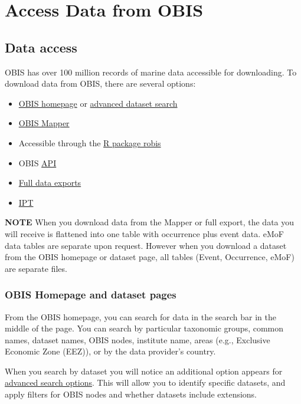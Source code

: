\documentclass[
  letterpaper,
  DIV=11,
  numbers=noendperiod,
  oneside]{scrreprt}
\providecommand{\tightlist}{%
  \setlength{\itemsep}{0pt}\setlength{\parskip}{0pt}}\usepackage{longtable,booktabs,array}
\begin{document}
\part{Access Data from OBIS}

\hypertarget{data-access}{%
\chapter{Data access}\label{data-access}}

OBIS has over 100 million records of marine data accessible for
downloading. To download data from OBIS, there are several options:

\begin{itemize}
\tightlist
\item
  \href{https://obis.org/}{OBIS homepage} or
  \href{https://obis.org/datasets}{advanced dataset search}
\item
  \href{https://mapper.obis.org}{OBIS Mapper}
\item
  Accessible through the \href{https://github.com/iobis/robis}{R package
  robis}
\item
  OBIS \href{https://api.obis.org/}{API}
\item
  \protect\hyperlink{full-exports}{Full data exports}
\item
  \href{ipt.html}{IPT}
\end{itemize}

\textbf{NOTE} When you download data from the Mapper or full export, the
data you will receive is flattened into one table with occurrence plus
event data. eMoF data tables are separate upon request. However when you
download a dataset from the OBIS homepage or dataset page, all tables
(Event, Occurrence, eMoF) are separate files.

\hypertarget{obis-homepage-and-dataset-pages}{%
\section{OBIS Homepage and dataset
pages}\label{obis-homepage-and-dataset-pages}}

From the OBIS homepage, you can search for data in the search bar in the
middle of the page. You can search by particular taxonomic groups,
common names, dataset names, OBIS nodes, institute name, areas (e.g.,
Exclusive Economic Zone (EEZ)), or by the data provider's country.

When you search by dataset you will notice an additional option appears
for \href{https://obis.org/datasets}{advanced search options}. This will
allow you to identify specific datasets, and apply filters for OBIS
nodes and whether datasets include extensions.
\end{document}
